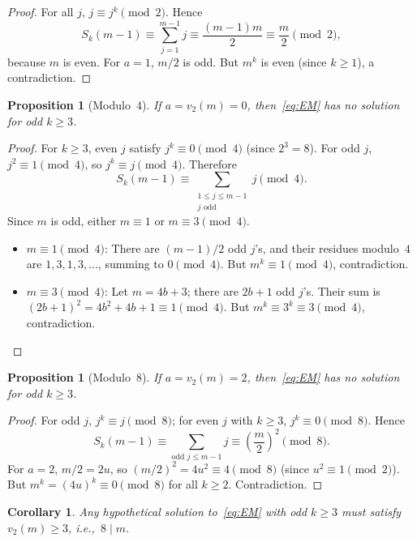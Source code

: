 \documentclass[12pt,a4paper]{article}
\theoremstyle{plain}
\newtheorem{corollary}[theorem]{Corollary}
\newtheorem{proposition}[theorem]{Proposition}
\theoremstyle{definition}
\newcommand{\ie}{\textit{i.e.},\ }
\begin{document}
\begin{proof}
  For all $j$, $j \equiv j^k \pmod{2}$.  Hence
  \[
    S_k(m-1) \equiv \sum_{j=1}^{m-1} j
    \equiv \frac{(m-1)m}{2} \equiv \frac{m}{2} \pmod{2},
  \]
  because $m$ is even.  For $a=1$, $m/2$ is odd.  But $m^k$ is even (since
  $k \ge 1$), a contradiction.
\end{proof}

\begin{proposition}[Modulo~$4$]\label{prop:mod4}
  If $a = v_2(m) = 0$, then~\eqref{eq:EM} has no solution for odd $k \ge 3$.
\end{proposition}

\begin{proof}
  For $k \ge 3$, even $j$ satisfy $j^k \equiv 0 \pmod{4}$ (since $2^3 = 8$).
  For odd $j$, $j^2 \equiv 1 \pmod{4}$, so $j^k \equiv j \pmod{4}$.
  Therefore
  \[
    S_k(m-1) \equiv \sum_{\substack{1 \le j \le m-1 \\ j \text{ odd}}} j \pmod{4}.
  \]
  Since $m$ is odd, either $m \equiv 1$ or $m \equiv 3 \pmod{4}$.
  \begin{itemize}[nosep]
    \item $m \equiv 1 \pmod{4}$: There are $(m-1)/2$ odd $j$'s, and their
      residues modulo~$4$ are $1,3,1,3,\dots$, summing to $0 \pmod{4}$.
      But $m^k \equiv 1 \pmod{4}$, contradiction.
    \item $m \equiv 3 \pmod{4}$: Let $m = 4b+3$; there are $2b+1$ odd
      $j$'s.  Their sum is $(2b+1)^2 = 4b^2 + 4b + 1 \equiv 1 \pmod{4}$.
      But $m^k \equiv 3^k \equiv 3 \pmod{4}$, contradiction.
  \end{itemize}
\end{proof}

\begin{proposition}[Modulo~$8$]\label{prop:mod8}
  If $a = v_2(m) = 2$, then~\eqref{eq:EM} has no solution for odd $k \ge 3$.
\end{proposition}

\begin{proof}
  For odd $j$, $j^k \equiv j \pmod{8}$; for even $j$ with $k \ge 3$,
  $j^k \equiv 0 \pmod{8}$.  Hence
  \[
    S_k(m-1) \equiv \sum_{\text{odd } j \le m-1} j
    \equiv \left(\frac{m}{2}\right)^2 \pmod{8}.
  \]
  For $a=2$, $m/2 = 2u$, so $(m/2)^2 = 4u^2 \equiv 4 \pmod{8}$ (since $u^2
  \equiv 1 \pmod{2}$).  But $m^k = (4u)^k \equiv 0 \pmod{8}$ for all
  $k \ge 2$.  Contradiction.
\end{proof}

\begin{corollary}\label{cor:age3}
  Any hypothetical solution to~\eqref{eq:EM} with odd $k \ge 3$ must satisfy
  $v_2(m) \ge 3$, \ie $8 \mid m$.
\end{corollary}
\end{document}
